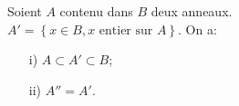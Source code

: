 \begin{maproposition}
	Soient $A $ contenu dans $ B$ deux anneaux.\\
	$A' =\left\{x \in B, x\text{ entier sur } A\right\}$. On a:
	\begin{enumerate}
		\item[i)] $A \subset A' \subset B $;
		\item[ii)] $A'' = A'$.
	\end{enumerate}
\end{maproposition}
